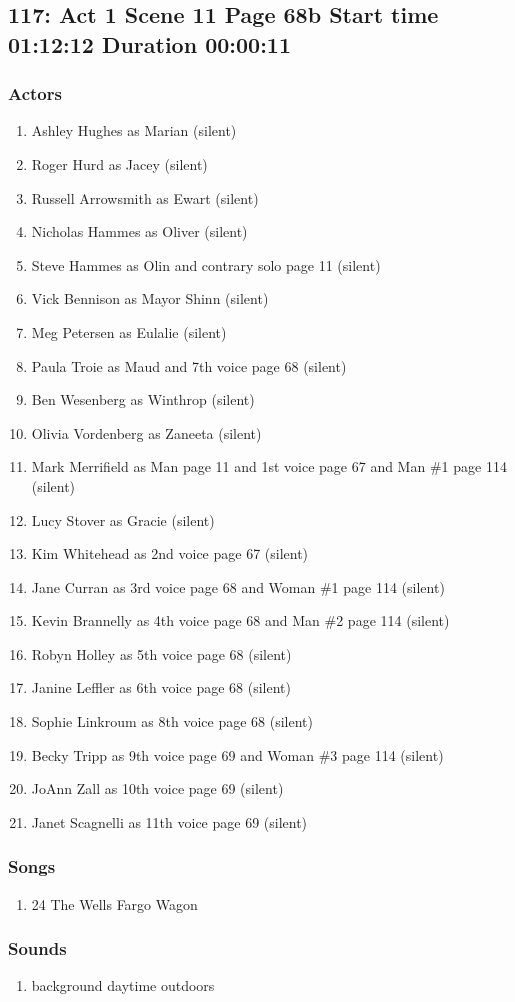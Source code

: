 \subsection{117: Act 1 Scene 11 Page 68b Start time 01:12:12 Duration 00:00:11}

\subsubsection{Actors}
\begin{enumerate}
\item Ashley Hughes as Marian (silent)
\item Roger Hurd as Jacey (silent)
\item Russell Arrowsmith as Ewart (silent)
\item Nicholas Hammes as Oliver (silent)
\item Steve Hammes as Olin and contrary solo page 11 (silent)
\item Vick Bennison as Mayor Shinn (silent)
\item Meg Petersen as Eulalie (silent)
\item Paula Troie as Maud and 7th voice page 68 (silent)
\item Ben Wesenberg as Winthrop (silent)
\item Olivia Vordenberg as Zaneeta (silent)
\item Mark Merrifield as Man page 11 and 1st voice page 67 and Man \#1 page 114 (silent)
\item Lucy Stover as Gracie (silent)
\item Kim Whitehead as 2nd voice page 67 (silent)
\item Jane Curran as 3rd voice page 68 and Woman \#1 page 114 (silent)
\item Kevin Brannelly as 4th voice page 68 and Man \#2 page 114 (silent)
\item Robyn Holley as 5th voice page 68 (silent)
\item Janine Leffler as 6th voice page 68 (silent)
\item Sophie Linkroum as 8th voice page 68 (silent)
\item Becky Tripp as 9th voice page 69 and Woman \#3 page 114 (silent)
\item JoAnn Zall as 10th voice page 69 (silent)
\item Janet Scagnelli as 11th voice page 69 (silent)
\end{enumerate}

\subsubsection{Songs}
\begin{enumerate}
\item 24 The Wells Fargo Wagon
\end{enumerate}\subsubsection{Sounds}
\begin{enumerate}
\item background daytime outdoors
\end{enumerate}
